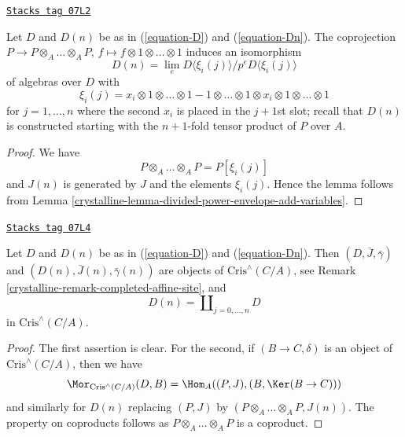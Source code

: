 \begin{lemma}[Structure Dn]
\label{crystalline-lemma-structure-Dn}
\href{https://stacks.math.columbia.edu/tag/07L2}{\texttt{Stacks tag 07L2}}

Let $D$ and $D(n)$ be as in (\ref{equation-D}) and (\ref{equation-Dn}).
The coprojection $P \to P \otimes_A \ldots \otimes_A P$,
$f \mapsto f \otimes 1 \otimes \ldots \otimes 1$
induces an isomorphism
\begin{equation}
\label{equation-structure-Dn}
D(n) = \lim_e D\langle \xi_i(j) \rangle/p^eD\langle \xi_i(j) \rangle
\end{equation}
of algebras over $D$ with
$$
\xi_i(j) = x_i \otimes 1 \otimes \ldots \otimes 1 -
1 \otimes \ldots \otimes 1 \otimes x_i \otimes 1 \otimes \ldots \otimes 1
$$
for $j = 1, \ldots, n$ where the second $x_i$ is placed in the $j + 1$st
slot; recall that $D(n)$ is constructed starting with the
$n + 1$-fold tensor product of $P$ over $A$.
\end{lemma}

\begin{proof}

We have
$$
P \otimes_A \ldots \otimes_A P = P[\xi_i(j)]
$$
and $J(n)$ is generated by $J$ and the elements $\xi_i(j)$.
Hence the lemma follows from
Lemma \ref{crystalline-lemma-divided-power-envelope-add-variables}.
\end{proof}

\begin{lemma}[Property Dn]
\label{crystalline-lemma-property-Dn}
\href{https://stacks.math.columbia.edu/tag/07L4}{\texttt{Stacks tag 07L4}}

Let $D$ and $D(n)$ be as in (\ref{equation-D}) and (\ref{equation-Dn}).
Then $(D, \bar J, \bar\gamma)$ and $(D(n), \bar J(n), \bar\gamma(n))$
are objects of $\text{Cris}^\wedge(C/A)$, see
Remark \ref{crystalline-remark-completed-affine-site}, and
$$
D(n) = \coprod\nolimits_{j = 0, \ldots, n} D
$$
in $\text{Cris}^\wedge(C/A)$.
\end{lemma}

\begin{proof}
The first assertion is clear. For the second, if $(B \to C, \delta)$ is an
object of $\text{Cris}^\wedge(C/A)$, then we have
$$
\Mor_{\text{Cris}^\wedge(C/A)}(D, B) =
\Hom_A((P, J), (B, \Ker(B \to C)))
$$
and similarly for $D(n)$ replacing $(P, J)$ by
$(P \otimes_A \ldots \otimes_A P, J(n))$. The property on coproducts follows
as $P \otimes_A \ldots \otimes_A P$ is a coproduct.
\end{proof}

